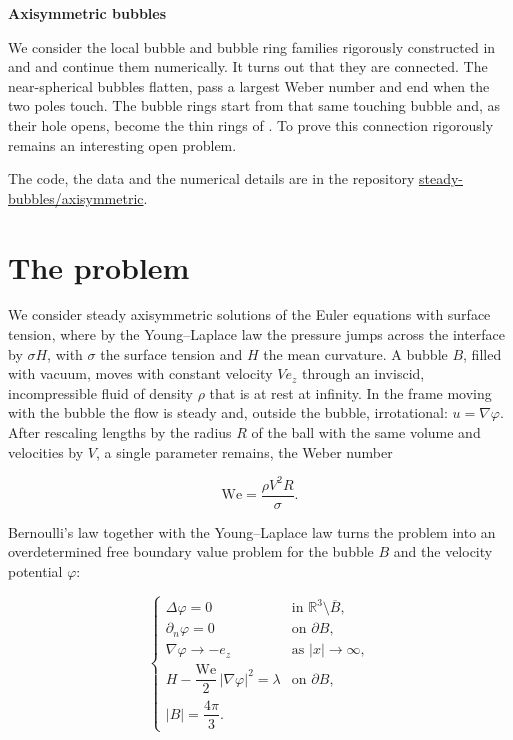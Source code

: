 \documentclass[11pt]{article}
\newcommand{\pagetitle}[1]{{\LARGE\bfseries #1\par}\medskip}
\begin{document}
\pagetitle{Axisymmetric bubbles}

We consider the local bubble and bubble ring families rigorously constructed in \cite{mns} and \cite{ms} and continue them numerically. It turns out that they are connected. The near-spherical bubbles flatten, pass a largest Weber number and end when the two poles touch. The bubble rings start from that same touching bubble and, as their hole opens, become the thin rings of \cite{ms}. To prove this connection rigorously remains an interesting open problem.

The code, the data and the numerical details are in the repository \href{https://github.com/steady-bubbles/axisymmetric}{steady-bubbles/axisymmetric}.

\section*{The problem}

We consider steady axisymmetric solutions of the Euler equations with surface tension, where by the Young--Laplace law the pressure jumps across the interface by \(\sigma H\), with \(\sigma\) the surface tension and \(H\) the mean curvature. A bubble \(B\), filled with vacuum, moves with constant velocity \(V e_z\) through an inviscid, incompressible fluid of density \(\rho\) that is at rest at infinity. In the frame moving with the bubble the flow is steady and, outside the bubble, irrotational: \(u = \nabla\varphi\). After rescaling lengths by the radius \(R\) of the ball with the same volume and velocities by \(V\), a single parameter remains, the Weber number

\[ \mathrm{We} = \frac{\rho V^2 R}{\sigma}. \]

Bernoulli's law together with the Young--Laplace law turns the problem into an overdetermined free boundary value problem for the bubble \(B\) and the velocity potential \(\varphi\):

\[ \begin{cases} \Delta \varphi = 0 & \text{in } \mathbb{R}^3 \setminus \overline{B}, \\[2pt] \partial_n \varphi = 0 & \text{on } \partial B, \\[2pt] \nabla \varphi \to -e_z & \text{as } |x| \to \infty, \\[2pt] H - \dfrac{\mathrm{We}}{2}\, |\nabla \varphi|^2 = \lambda & \text{on } \partial B, \\[2pt] |B| = \dfrac{4\pi}{3}. \end{cases} \]
\end{document}
